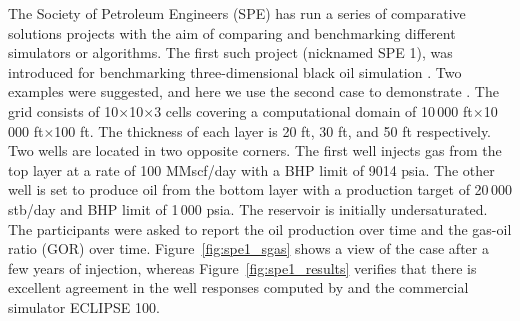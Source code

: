 The Society of Petroleum Engineers (SPE) has run a series of
comparative solutions projects with the aim of comparing and
benchmarking different simulators or algorithms. The first such
project (nicknamed SPE 1), was introduced for benchmarking
three-dimensional black oil simulation
\citep{odeh1981comparison}. Two examples were suggested, and here we
use the second case to demonstrate \opmflow. The
grid consists of 10$\times$10$\times$3 cells covering a computational
domain of 10\,000 ft$\times$10\,000 ft$\times$100 ft. The thickness of each layer is
20 ft, 30 ft, and 50 ft respectively. Two wells are located in two opposite corners.
The first well injects gas from
the top layer at a rate of 100 MMscf/day with a BHP limit of 9014
psia. The other well is set to produce oil from the bottom layer with a
production target of 20\,000 stb/day and BHP limit of 1\,000 psia. The reservoir is
initially undersaturated. The participants were asked to report the oil production
over time and the gas-oil ratio (GOR) over time. Figure~\ref{fig:spe1_sgas} shows a view of the
case after a few years of injection, whereas Figure~\ref{fig:spe1_results} verifies
that there is excellent agreement in the well responses
computed by \opmflow and the commercial simulator ECLIPSE 100.





